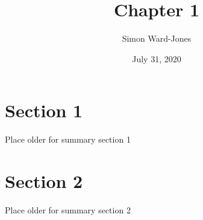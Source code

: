 \documentclass[12pt,notitlepage]{article}
\begin{document}


\title{\Large{\textbf{Chapter 1}}}
\date{July 31, 2020}
\author{Simon Ward-Jones}

\maketitle

\section{Section 1}
Place older for summary section 1

\section{Section 2}
Place older for summary section 2

\vfill

\nocite{LeCun2015}
\end{document}

